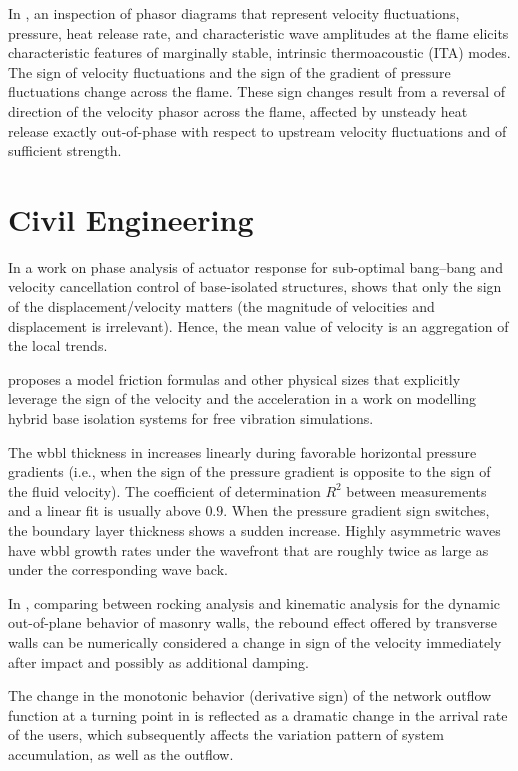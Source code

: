 \documentclass[11pt]{book}
\begin{document}
In \cite{yong2021categorization}, an inspection of phasor diagrams
that represent velocity fluctuations, pressure, heat release rate,
and characteristic wave amplitudes at the flame elicits characteristic
features of marginally stable, intrinsic thermoacoustic (ITA) modes.
The sign of velocity fluctuations and the sign of the gradient of
pressure fluctuations change across the flame. These sign changes
result from a reversal of direction of the velocity phasor across
the flame, affected by unsteady heat release exactly out-of-phase
with respect to upstream velocity fluctuations and of sufficient strength.


\section{Civil Engineering}

In a work on phase analysis of actuator response for
sub-optimal bang–bang and velocity cancellation control of base-isolated structures, \cite{austin2007phase} shows that only the sign of the displacement/velocity
matters (the magnitude of velocities and displacement is irrelevant).
Hence, the mean value of velocity is an aggregation of the local trends.

\cite{athanasiou2011modelling} proposes a model friction formulas 
and other physical sizes that explicitly leverage the sign of the velocity
and the acceleration in a work on modelling hybrid base isolation systems
for free vibration simulations.

The wbbl thickness in \cite{henriquez2014piv} increases linearly
during favorable horizontal pressure gradients (i.e., when the sign
of the pressure gradient is opposite to the sign of the fluid velocity).
The coefficient of determination $R^{2}$ between measurements and
a linear fit is usually above $0.9$. When the pressure gradient sign
switches, the boundary layer thickness shows a sudden increase. Highly
asymmetric waves have wbbl growth rates under the wavefront that are
roughly twice as large as under the corresponding wave back.

In \cite{giresini2015comparison}, comparing between rocking analysis and kinematic analysis for the dynamic out-of-plane behavior of masonry walls, the rebound effect offered by transverse walls can be numerically considered a change in sign of the velocity immediately
after impact and possibly as additional damping.

The change in the monotonic behavior (derivative sign) of the network
outflow function at a turning point in \cite{amirgholy2017modeling}
is reflected as a dramatic change in the arrival rate of the users,
which subsequently affects the variation pattern of system accumulation,
as well as the outflow.
\end{document}
